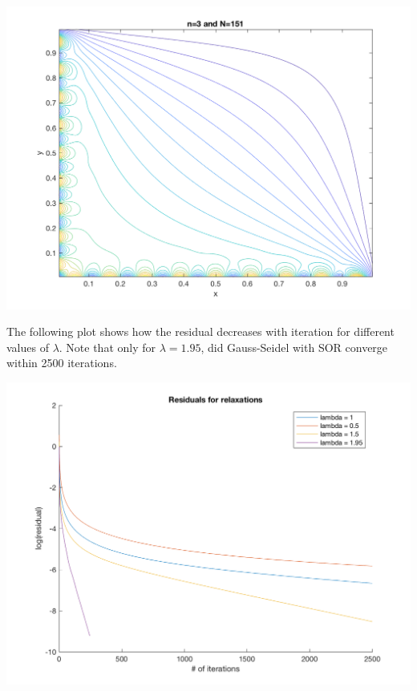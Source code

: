 \documentclass[11pt, oneside]{article}
\begin{document}
\begin{enumerate}
\begin{center}
      \includegraphics[scale=0.4]{Figures/05_4.png}
    \end{center}
    The following plot shows how the residual decreases with iteration for
    different values of $\lambda$.
    Note that only for $\lambda = 1.95$, did Gauss-Seidel with SOR converge
    within 2500 iterations.
    \begin{center}
      \includegraphics[scale=0.7]{Figures/05_5.png}
    \end{center}


\end{enumerate}
\end{document}
